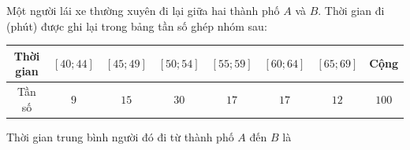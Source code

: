 \begin{ex}
Một người lái xe thường xuyên đi lại giữa hai thành phố $A$ và $B$. Thời gian đi (phút) được ghi lại trong bảng tần số ghép nhóm sau:
\begin{center}
\begin{tabular}{|c|c|c|c|c|c|c|c|}\hline
Thời gian & $[40;44]$ & $[45;49]$ & $[50;54]$ & $[55;59]$ & $[60;64]$ & $[65;69]$ & Cộng\\\hline
Tần số & $9$ & $15$ & $30$ & $17$ & $17$ & $12$ & $100$\\\hline
\end{tabular}
\end{center}
Thời gian trung bình người đó đi từ thành phố $A$ đến $B$ là
\end{ex}
